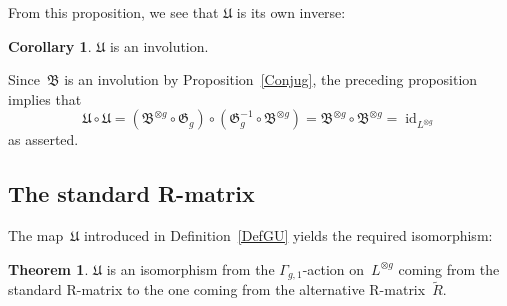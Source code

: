 \documentclass[12pt]{article}
\makeatletter
\theoremstyle{definition}
\newtheorem{Cor}[Satz]{Corollary}
\newtheorem{Theorem}[Satz]{Theorem}
\theoremstyle{break}
\renewenvironment{proof}[1][\proofname]{\par
\vspace{-5pt}%
\pushQED{\qed}%
\normalfont
\topsep0pt \partopsep0pt %
\trivlist
\item[\hskip\labelsep
\bfseries
#1\@addpunct{.}]\ignorespaces
}{%
\popQED\endtrivlist\@endpefalse
\addvspace{6pt plus 6pt} %
}
\DeclareMathOperator\id{id}
\newcommand{\fB}{\mathfrak{B}}
\newcommand{\fG}{\mathfrak{G}}
\newcommand{\fU}{\mathfrak{U}}
\renewcommand{\1}{\mathbbm{1}}
\newcommand{\ot}{\mathbin{\otimes}}
\makeatother
\begin{document}
From this proposition, we see that $\fU$ is its own inverse:
\begin{Cor}
$\fU$ is an involution.
\end{Cor}
\begin{proof}
Since~$\fB$ is an involution by Proposition~\ref{Conjug}, the preceding proposition implies that
\[\fU \circ \fU = (\fB^{\ot g} \circ \fG_g) \circ (\fG_g^{-1} \circ \fB^{\ot g})
= \fB^{\ot g} \circ \fB^{\ot g} = \id_{L^{\ot g}}\]
as asserted.
\end{proof}


\subsection{The standard R-matrix} \label{StandRMat}
The map~$\fU$ introduced in Definition~\ref{DefGU} yields the required isomorphism:
\begin{Theorem} \label{RepIsom}
$\fU$ is an isomorphism from the $\Gamma_{g,1}$-action on~$L^{\ot g}$ coming from the standard R-matrix to the one coming from the alternative R-matrix~$\tilde{R}$.
\end{Theorem}
\end{document}
